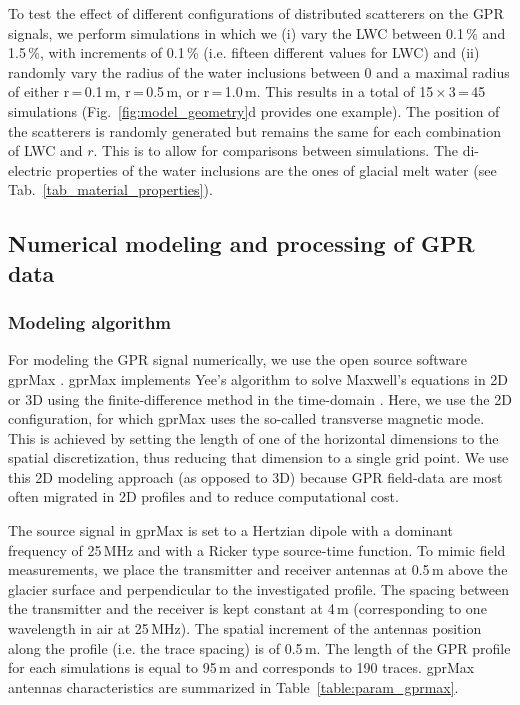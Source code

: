 To test the effect of different configurations of distributed scatterers on the GPR signals, we perform simulations in which we (i) vary the LWC between 0.1\,\% and 1.5\,\%, with increments of 0.1\,\% (i.e. fifteen different values for LWC) and (ii) randomly vary the radius of the water inclusions between 0 and a maximal radius of either r\,=\,0.1\,m, r\,=\,0.5\,m, or r\,=\,1.0\,m. This results in a total of 15\,$\times$\,3\,=\,45 simulations (Fig.~\ref{fig:model_geometry}d provides one example). The position of the scatterers is randomly generated but remains the same for each combination of LWC and $r$. This is to allow for comparisons between simulations. The di-electric properties of the water inclusions are the ones of glacial melt water (see Tab.~\ref{tab_material_properties}). 


\subsection{Numerical modeling and processing of GPR data}

\subsubsection{Modeling algorithm}

For modeling the GPR signal  numerically, we use the open source software gprMax \citep{Warren&al2016}. gprMax implements Yee's algorithm to solve Maxwell’s equations in 2D or 3D using the finite-difference method in the time-domain \citep[FDTD,][]{Kunz&Luebbers1993}. Here, we use the 2D configuration, for which gprMax uses the so-called transverse magnetic mode. This is achieved by setting the length of one of the horizontal dimensions to the spatial discretization, thus reducing that dimension to a single grid point. We use this 2D modeling approach (as opposed to 3D) because GPR field-data are most often migrated in 2D profiles and to reduce computational cost.

The source signal in gprMax is set to a Hertzian dipole with a dominant frequency of 25\,MHz \citep[a typical frequency for investigations on Apline glaciers; e.g.][]{Grab&al2021,Church&al2020} and with a Ricker type source-time function. To mimic field measurements, we place the transmitter and receiver antennas at 0.5\,m above the glacier surface and perpendicular to the investigated profile. The spacing between the transmitter and the receiver is kept constant at 4\,m (corresponding to one wavelength in air at 25\,MHz). The spatial increment of the antennas position along the profile (i.e. the trace spacing) is of 0.5\,m. The length of the GPR profile for each simulations is equal to 95\,m and corresponds to 190 traces. gprMax antennas characteristics are summarized in Table~\ref{table:param_gprmax}. 

